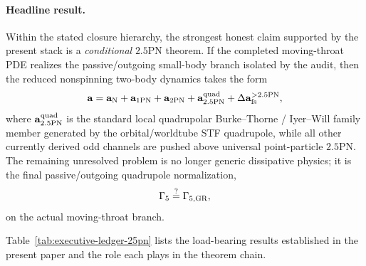 \documentclass[11pt]{article}
\begin{document}
\paragraph{Headline result.}
Within the stated closure hierarchy, the strongest honest claim supported by the
present stack is a \emph{conditional} $2.5$PN theorem.  If the completed
moving-throat PDE realizes the passive/outgoing small-body branch isolated by
the audit, then the reduced nonspinning two-body dynamics takes the form
\[
\mathbf a
=
\mathbf a_{\rm N}
+ \mathbf a_{1\rm PN}
+ \mathbf a_{2\rm PN}
+ \mathbf a_{2.5\rm PN}^{\rm quad}
+ \Delta\mathbf a_{\rm fs}^{>2.5\rm PN},
\]
where $\mathbf a_{2.5\rm PN}^{\rm quad}$ is the standard local quadrupolar
Burke--Thorne / Iyer--Will family member generated by the orbital/worldtube STF
quadrupole, while all other currently derived odd channels are pushed above
universal point-particle $2.5$PN.  The remaining unresolved problem is no
longer generic dissipative physics; it is the final passive/outgoing quadrupole
normalization,
\[
\Gamma_5 \stackrel{?}{=} \Gamma_{5,{\rm GR}},
\]
on the actual moving-throat branch.

Table~\ref{tab:executive-ledger-25pn} lists the load-bearing results established
in the present paper and the role each plays in the theorem chain.
\end{document}
